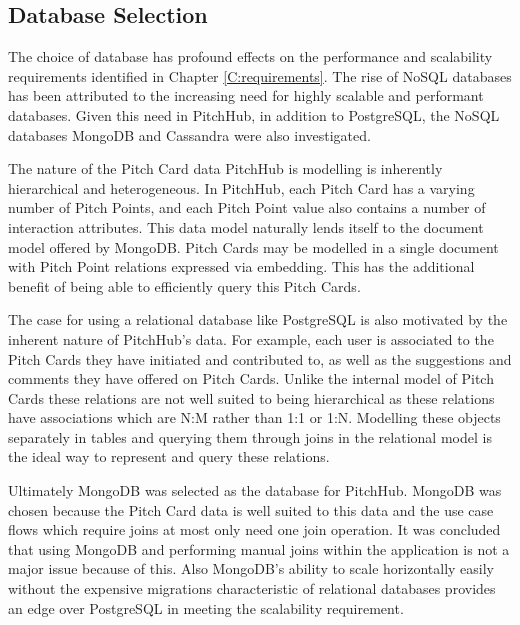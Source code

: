 \subsection{Database Selection}

The choice of database has profound effects on the performance and scalability requirements identified in Chapter \ref{C:requirements}. The rise of NoSQL databases has been attributed to the increasing need for highly scalable and performant databases. Given this need in PitchHub, in addition to PostgreSQL, the NoSQL databases MongoDB and Cassandra were also investigated.
\par
The nature of the Pitch Card data PitchHub is modelling is inherently hierarchical and heterogeneous. In PitchHub, each Pitch Card has a varying number of Pitch Points, and each Pitch Point value also contains a number of interaction attributes. This data model naturally lends itself to the document model offered by MongoDB. Pitch Cards may be modelled in a single document with Pitch Point relations expressed via embedding. This has the additional benefit of being able to efficiently query this Pitch Cards.
\par
The case for using a relational database like PostgreSQL is also motivated by the inherent nature of PitchHub's data. For example, each user is associated to the Pitch Cards they have initiated and contributed to, as well as the suggestions and comments they have offered on Pitch Cards. Unlike the internal model of Pitch Cards these relations are not well suited to being hierarchical as these relations have associations which are N:M rather than 1:1 or 1:N. Modelling these objects separately in tables and querying them through joins in the relational model is the ideal way to represent and query these relations.
\par
Ultimately MongoDB was selected as the database for PitchHub. MongoDB was chosen because the Pitch Card data is well suited to this data and the use case flows which require joins at most only need one join operation. It was concluded that using MongoDB and performing manual joins within the application is not a major issue because of this. Also MongoDB's ability to scale horizontally easily without the expensive migrations characteristic of relational databases provides an edge over PostgreSQL in meeting the scalability requirement.

